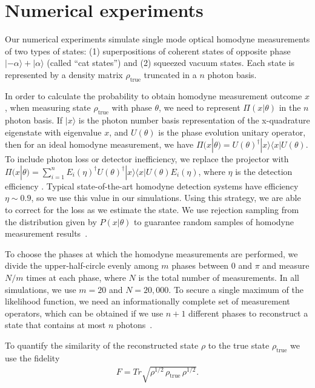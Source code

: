 \documentclass[
reprint,
superscriptaddress,
showpacs,
amsmath,
amssymb,
aps,
pra,
longbibliography
]{revtex4-1}
\newcommand{\rhotrue}{\rho_{\text{true}}}
\begin{document}
\section{Numerical experiments}
\label{numerical-experiments}
Our numerical experiments simulate single mode optical homodyne
measurements of two types of states: (1) superpositions of coherent states of 
opposite phase $|-\alpha\rangle + |\alpha\rangle$ (called ``cat states'') and 
(2) squeezed vacuum states. Each state is represented by a density matrix 
$\rho_{\mathrm{true}}$ truncated in a $n$ photon basis.

In order to calculate the probability to obtain homodyne measurement
outcome $x$, when measuring state $\rho_{\mathrm{true}}$ with phase
$\theta$, we need to represent $\Pi (x|\theta)$ in the $n$ photon
basis. If $|x\rangle$ is the photon number basis
representation of the x-quadrature eigenstate with eigenvalue $x$, and
$U(\theta)$ is the phase evolution unitary operator, then for an ideal
homodyne measurement, we have
$\Pi (x|\theta) = U(\theta)^{\dagger}|x\rangle \langle x|
U(\theta)$. To include photon loss or detector inefficiency, we replace 
the projector with $\Pi (x|\theta) = \sum_{i=1}^{n} E_i(\eta)^{\dagger}
U(\theta)^{\dagger}|x\rangle \langle x| U(\theta) E_i(\eta)$, where
$\eta$ is the detection efficiency \cite{Lvovsky2004}.
Typical state-of-the-art homodyne detection systems have efficiency 
$\eta \sim 0.9$, so we use this value in our simulations. Using this strategy, 
we are able to correct for the loss as we estimate the state. We use rejection
sampling from the distribution given by $P(x|\theta)$ to guarantee
random samples of homodyne measurement results~\cite{Kennedy1980}.

To choose the phases at which the homodyne measurements are performed,
we divide the upper-half-circle evenly among $m$ phases between 0 and
$\pi$ and measure $N/m$ times at each phase, where $N$ is the total
number of measurements. In all simulations, we use $m=20$ and
$N = 20,000$. To secure a single maximum of the likelihood function,
we need an informationally complete set of measurement operators,
which can be obtained if we use $n+1$ different phases to reconstruct
a state that contains at most $n$ photons~\cite{Leonhardt1997}.

To quantify the similarity of the reconstructed state $\rho$ to the 
true state $\rhotrue$ we use the fidelity
\begin{eqnarray}
  F = Tr \sqrt{\rho^{1/2}\, \rhotrue \, \rho^{1/2}}.
\end{eqnarray}
\end{document}
